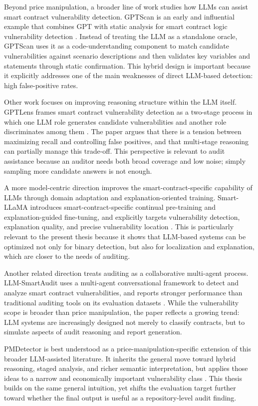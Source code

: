 Beyond price manipulation, a broader line of work studies how
LLMs can assist smart contract vulnerability detection. GPTScan is an early and
influential example that combines GPT with static analysis for smart contract
logic vulnerability detection \citep{gptscan}. Instead of treating the LLM as a
standalone oracle, GPTScan uses it as a code-understanding component to match
candidate vulnerabilities against scenario descriptions and then validates key
variables and statements through static confirmation. This hybrid design is
important because it explicitly addresses one of the main weaknesses of direct
LLM-based detection: high false-positive rates.

Other work focuses on improving reasoning structure within the LLM itself.
GPTLens frames smart contract vulnerability detection as a two-stage process in
which one LLM role generates candidate vulnerabilities and another role
discriminates among them \citep{gptlens}. The paper argues that there is a
tension between maximizing recall and controlling false positives, and that
multi-stage reasoning can partially manage this trade-off. This perspective is
relevant to audit assistance because an auditor needs both broad coverage and
low noise; simply sampling more candidate answers is not enough.

A more model-centric direction improves the smart-contract-specific capability
of LLMs through domain adaptation and explanation-oriented training.
Smart-LLaMA introduces smart-contract-specific continual pre-training and
explanation-guided fine-tuning, and explicitly targets vulnerability
detection, explanation quality, and precise vulnerability location
\citep{smartllama}. This is particularly relevant to the present thesis because
it shows that LLM-based systems can be optimized not only for binary detection,
but also for localization and explanation, which are closer to the needs of
auditing.

Another related direction treats auditing as a collaborative multi-agent
process. LLM-SmartAudit uses a multi-agent conversational framework to detect
and analyze smart contract vulnerabilities, and reports stronger performance
than traditional auditing tools on its evaluation datasets
\citep{llmsmartaudit}. While the vulnerability scope is broader than price
manipulation, the paper reflects a growing trend: LLM systems are increasingly
designed not merely to classify contracts, but to simulate aspects of audit
reasoning and report generation.

PMDetector is best understood as a price-manipulation-specific extension of
this broader LLM-assisted literature. It inherits the general move toward
hybrid reasoning, staged analysis, and richer semantic interpretation, but
applies those ideas to a narrow and economically important vulnerability class
\citep{pmdetector}. This thesis builds on the same general intuition, yet
shifts the evaluation target further toward whether the final output is useful
as a repository-level audit finding.

